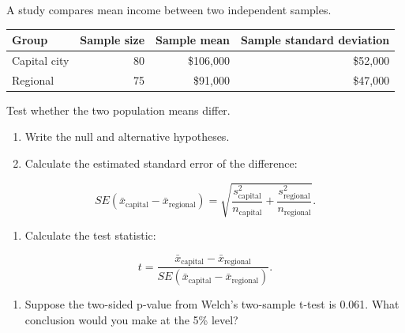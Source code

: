\documentclass[
  letterpaper,
  DIV=11,
  numbers=noendperiod]{scrreprt}
\newcounter{none} %
\providecommand{\tightlist}{%
  \setlength{\itemsep}{0pt}\setlength{\parskip}{0pt}}
\begin{document}
\begin{tcolorbox}[enhanced jigsaw, arc=.35mm, bottomrule=.15mm, bottomtitle=1mm, breakable, colback=white, colbacktitle=quarto-callout-note-color!10!white, colframe=quarto-callout-note-color-frame, coltitle=black, left=2mm, leftrule=.75mm, opacityback=0, opacitybacktitle=0.6, rightrule=.15mm, title=\textcolor{quarto-callout-note-color}{\faInfo}\hspace{0.5em}{Question 12}, titlerule=0mm, toprule=.15mm, toptitle=1mm]

A study compares mean income between two independent samples.

{\def\LTcaptype{none} %
\begin{longtable}[]{@{}lrrr@{}}
\toprule\noalign{}
Group & Sample size & Sample mean & Sample standard deviation \\
\midrule\noalign{}
\endhead
\bottomrule\noalign{}
\endlastfoot
Capital city & 80 & \$106,000 & \$52,000 \\
Regional & 75 & \$91,000 & \$47,000 \\
\end{longtable}
}

Test whether the two population means differ.

\begin{enumerate}
\def\labelenumi{\alph{enumi}.}
\tightlist
\item
  Write the null and alternative hypotheses.\\
\item
  Calculate the estimated standard error of the difference:
\end{enumerate}

\[
SE(\bar{x}_{\text{capital}} - \bar{x}_{\text{regional}})
=
\sqrt{
\frac{s^2_{\text{capital}}}{n_{\text{capital}}}
+
\frac{s^2_{\text{regional}}}{n_{\text{regional}}}
}.
\]

\begin{enumerate}
\def\labelenumi{\alph{enumi}.}
\setcounter{enumi}{2}
\tightlist
\item
  Calculate the test statistic:
\end{enumerate}

\[
t =
\frac{\bar{x}_{\text{capital}} - \bar{x}_{\text{regional}}}{SE(\bar{x}_{\text{capital}} - \bar{x}_{\text{regional}})}.
\]

\begin{enumerate}
\def\labelenumi{\alph{enumi}.}
\setcounter{enumi}{3}
\tightlist
\item
  Suppose the two-sided p-value from Welch's two-sample t-test is 0.061.
  What conclusion would you make at the 5\% level?
\end{enumerate}


\end{tcolorbox}
\end{document}
